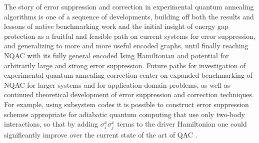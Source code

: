 The story of error suppression and correction in experimental quantum annealing algorithms is one of a sequence of developments, building off both the results and lessons of native benchmarking work and the initial insight of energy gap protection as a fruitful and feasible path on current systems for error suppression, and generalizing to more and more useful encoded graphs, until finally reaching NQAC with its fully general encoded Ising Hamiltonian and potential for arbitrarily large and strong error suppression. Future paths for investigation of experimental quantum annealing correction center on expanded benchmarking of NQAC for larger systems and for application-domain problems, as well as continued theoretical development of error suppression and correction techniques. For example, using subsystem codes it is possible to construct error suppression schemes appropriate for adiabatic quantum computing that use only two-body interactions, so that by adding $\sigma^x_i \sigma^x_j$ terms to the driver Hamiltonian one could significantly improve over the current state of the art of QAC  \cite{Marvian-Lidar:16,Jiang:2015kx}.


